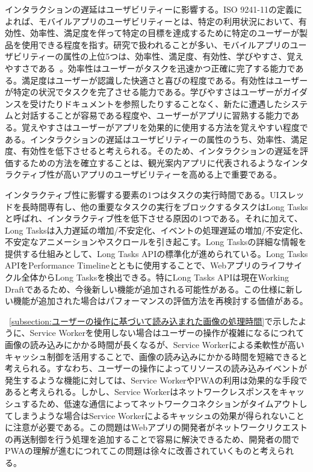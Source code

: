 インタラクションの遅延はユーザビリティーに影響する。ISO 9241-11の定義によれば、モバイルアプリのユーザビリティーとは、特定の利用状況において、有効性、効率性、満足度を伴って特定の目標を達成するために特定のユーザーが製品を使用できる程度を指す。研究で扱われることが多い、モバイルアプリのユーザビリティーの属性の上位5つは、効率性、満足度、有効性、学びやすさ、覚えやすさである~\cite{PawelUsabilityofMobileApplications}。効率性はユーザーがタスクを迅速かつ正確に完了する能力である。満足度はユーザーが認識した快適さと喜びの程度である。有効性はユーザーが特定の状況でタスクを完了させる能力である。学びやすさはユーザーがガイダンスを受けたりドキュメントを参照したりすることなく、新たに遭遇したシステムと対話することが容易である程度や、ユーザーがアプリに習熟する能力である。覚えやすさはユーザーがアプリを効果的に使用する方法を覚えやすい程度である。インタラクションの遅延はユーザビリティーの属性のうち、効率性、満足度、有効性を低下させると考えられる。そのため、インタラクションの遅延を評価するための方法を確立することは、観光案内アプリに代表されるようなインタラクティブ性が高いアプリのユーザビリティーを高める上で重要である。

インタラクティブ性に影響する要素の1つはタスクの実行時間である。UIスレッドを長時間専有し、他の重要なタスクの実行をブロックするタスクはLong Tasksと呼ばれ、インタラクティブ性を低下させる原因の1つである。それに加えて、Long Tasksは入力遅延の増加/不安定化、イベントの処理遅延の増加/不安定化、不安定なアニメーションやスクロールを引き起こす。Long Tasksの詳細な情報を提供する仕組みとして、Long Tasks APIの標準化が進められている。Long Tasks APIをPerformance Timelineとともに使用することで、Webアプリのライフサイクル全体からLong Tasksを検出できる。特にLong Tasks APIは現在Working Draftであるため、今後新しい機能が追加される可能性がある。この仕様に新しい機能が追加された場合はパフォーマンスの評価方法を再検討する価値がある。

~\autoref{subsection:ユーザーの操作に基づいて読み込まれた画像の処理時間}で示したように、Service Workerを使用しない場合はユーザーの操作が複雑になるにつれて画像の読み込みにかかる時間が長くなるが、Service Workerによる柔軟性が高いキャッシュ制御を活用することで、画像の読み込みにかかる時間を短縮できると考えられる。すなわち、ユーザーの操作によってリソースの読み込みイベントが発生するような機能に対しては、Service WorkerやPWAの利用は効果的な手段であると考えられる。しかし、Service Workerはネットワークレスポンスをキャッシュするため、低速な通信によってネットワークコネクションがタイムアウトしてしまうような場合はService Workerによるキャッシュの効果が得られないことに注意が必要である。この問題はWebアプリの開発者がネットワークリクエストの再送制御を行う処理を追加することで容易に解決できるため、開発者の間でPWAの理解が進むにつれてこの問題は徐々に改善されていくものと考えられる。

